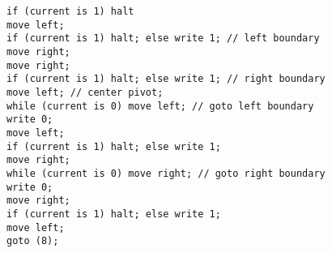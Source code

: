 \documentclass{ctexart}
\begin{document}
\begin{lstlisting}[frame=single]
if (current is 1) halt
move left;
if (current is 1) halt; else write 1; // left boundary
move right;
move right;
if (current is 1) halt; else write 1; // right boundary
move left; // center pivot;
while (current is 0) move left; // goto left boundary
write 0;
move left;
if (current is 1) halt; else write 1;
move right;
while (current is 0) move right; // goto right boundary
write 0;
move right;
if (current is 1) halt; else write 1;
move left;
goto (8);
\end{lstlisting}
\end{document}
